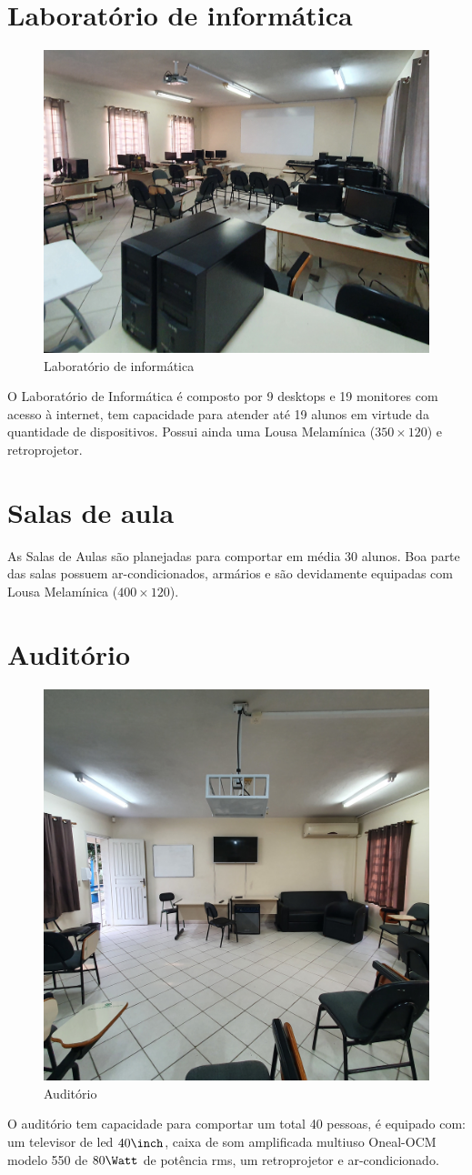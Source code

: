 \section{Laboratório de informática}
\setlength\intextsep{0pt}
\begin{figure}
    \centering
    \includegraphics[width=.45\textwidth]{03-elementos/03.2_textual/03.2.1_fig/sala-de-informatica02.jpg} 
    \caption{Laboratório de informática}
    \label{fig:salaDeInformatica}  
\end{figure}
O Laboratório de Informática é composto por 9 desktops e 19 monitores com acesso à internet, tem capacidade para atender até 19 alunos em virtude da quantidade de dispositivos. Possui ainda uma Lousa Melamínica ($350\times 120$)\cm\; e retroprojetor.

\section{Salas de aula}
As Salas de Aulas são planejadas para comportar em média 30 alunos. Boa parte das salas possuem ar-condicionados, armários e são devidamente equipadas com Lousa Melamínica ($400\times 120$)\cm.

\section{Auditório}
\setlength\intextsep{0pt}
\begin{figure}
    \centering
    \includegraphics[width=.35\textwidth]{03-elementos/03.2_textual/03.2.1_fig/auditorio01.jpg} 
    \caption{Auditório}
    \label{fig:auditorio}    
\end{figure}
O auditório tem capacidade para comportar um total 40 pessoas, é equipado com: um televisor de led $40\inch$, caixa de som amplificada multiuso Oneal-OCM modelo 550 de $80\Watt$ de potência rms, um retroprojetor e ar-condicionado.

